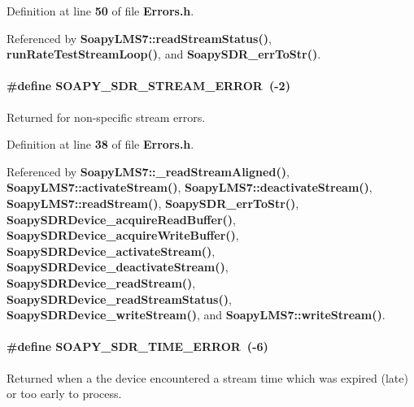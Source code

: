 Definition at line {\bf 50} of file {\bf Errors.\+h}.



Referenced by {\bf Soapy\+L\+M\+S7\+::read\+Stream\+Status()}, {\bf run\+Rate\+Test\+Stream\+Loop()}, and {\bf Soapy\+S\+D\+R\+\_\+err\+To\+Str()}.

\paragraph[{S\+O\+A\+P\+Y\+\_\+\+S\+D\+R\+\_\+\+S\+T\+R\+E\+A\+M\+\_\+\+E\+R\+R\+OR}]{\setlength{\rightskip}{0pt plus 5cm}\#define S\+O\+A\+P\+Y\+\_\+\+S\+D\+R\+\_\+\+S\+T\+R\+E\+A\+M\+\_\+\+E\+R\+R\+OR~(-\/2)}\label{Errors_8h_a45c03a18b2e64e320170cda218ed1d5b}
Returned for non-\/specific stream errors. 

Definition at line {\bf 38} of file {\bf Errors.\+h}.



Referenced by {\bf Soapy\+L\+M\+S7\+::\+\_\+read\+Stream\+Aligned()}, {\bf Soapy\+L\+M\+S7\+::activate\+Stream()}, {\bf Soapy\+L\+M\+S7\+::deactivate\+Stream()}, {\bf Soapy\+L\+M\+S7\+::read\+Stream()}, {\bf Soapy\+S\+D\+R\+\_\+err\+To\+Str()}, {\bf Soapy\+S\+D\+R\+Device\+\_\+acquire\+Read\+Buffer()}, {\bf Soapy\+S\+D\+R\+Device\+\_\+acquire\+Write\+Buffer()}, {\bf Soapy\+S\+D\+R\+Device\+\_\+activate\+Stream()}, {\bf Soapy\+S\+D\+R\+Device\+\_\+deactivate\+Stream()}, {\bf Soapy\+S\+D\+R\+Device\+\_\+read\+Stream()}, {\bf Soapy\+S\+D\+R\+Device\+\_\+read\+Stream\+Status()}, {\bf Soapy\+S\+D\+R\+Device\+\_\+write\+Stream()}, and {\bf Soapy\+L\+M\+S7\+::write\+Stream()}.

\paragraph[{S\+O\+A\+P\+Y\+\_\+\+S\+D\+R\+\_\+\+T\+I\+M\+E\+\_\+\+E\+R\+R\+OR}]{\setlength{\rightskip}{0pt plus 5cm}\#define S\+O\+A\+P\+Y\+\_\+\+S\+D\+R\+\_\+\+T\+I\+M\+E\+\_\+\+E\+R\+R\+OR~(-\/6)}\label{Errors_8h_a45163ebd048c7a285ca22ed64b518771}
Returned when a the device encountered a stream time which was expired (late) or too early to process. 


